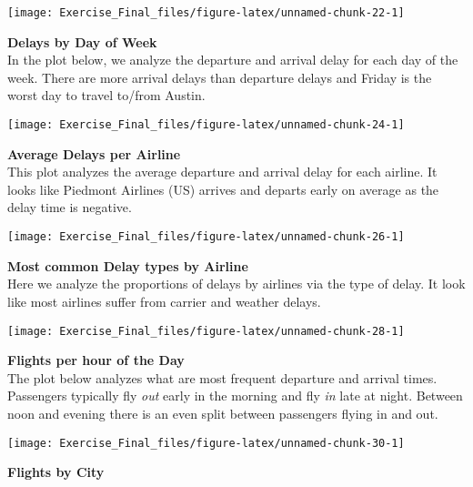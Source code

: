 \documentclass[
]{article}
\begin{document}
\begin{center}\texttt{[image: Exercise\_Final\_files/figure-latex/unnamed-chunk-22-1]} \end{center}

\textbf{Delays by Day of Week}\\

In the plot below, we analyze the departure and arrival delay for each
day of the week. There are more arrival delays than departure delays and
Friday is the worst day to travel to/from Austin.

\begin{center}\texttt{[image: Exercise\_Final\_files/figure-latex/unnamed-chunk-24-1]} \end{center}

\textbf{Average Delays per Airline}\\

This plot analyzes the average departure and arrival delay for each
airline. It looks like Piedmont Airlines (US) arrives and departs early
on average as the delay time is negative.

\begin{center}\texttt{[image: Exercise\_Final\_files/figure-latex/unnamed-chunk-26-1]} \end{center}

\textbf{Most common Delay types by Airline}\\

Here we analyze the proportions of delays by airlines via the type of
delay. It look like most airlines suffer from carrier and weather
delays.

\begin{center}\texttt{[image: Exercise\_Final\_files/figure-latex/unnamed-chunk-28-1]} \end{center}

\textbf{Flights per hour of the Day}\\

The plot below analyzes what are most frequent departure and arrival
times. Passengers typically fly \emph{out} early in the morning and fly
\emph{in} late at night. Between noon and evening there is an even split
between passengers flying in and out.

\begin{center}\texttt{[image: Exercise\_Final\_files/figure-latex/unnamed-chunk-30-1]} \end{center}

\textbf{Flights by City}\\
\end{document}
